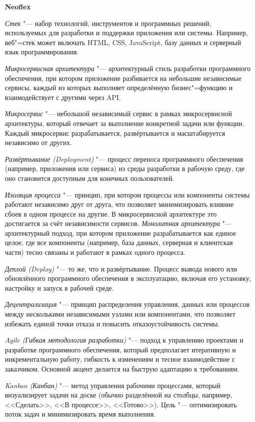 \documentclass{article}
\begin{document}
\begin{center}
    \textbf{Neoflex}
\end{center}

\textit{Стек} "--- набор технологий, инструментов и программных решений, используемых для разработки и поддержки приложения или системы. Например, веб"=стек может включать HTML, CSS, JavaScript, базу данных и серверный язык программирования.

\textit{Микросервисная архитектура} "--- архитектурный стиль разработки программного обеспечения, при котором приложение разбивается на небольшие независимые сервисы, каждый из которых выполняет определённую бизнес"=функцию и взаимодействует с другими через API.

\textit{Микросервис} "--- небольшой независимый сервис в рамках микросервисной архитектуры, который отвечает за выполнение конкретной задачи или функции. Каждый микросервис разрабатывается, развёртывается и масштабируется независимо от других.

\textit{Развёртывание (Deployment)} "--- процесс переноса программного обеспечения (например, приложения или сервиса) из среды разработки в рабочую среду, где оно становится доступным для конечных пользователей.

\textit{Изоляция процесса} "--- принцип, при котором процессы или компоненты системы работают независимо друг от друга, что позволяет минимизировать влияние сбоев в одном процессе на другие. В микросервисной архитектуре это достигается за счёт независимости сервисов.
\textit{Монолитная архитектура} "--- архитектурный подход, при котором приложение разрабатывается как единое целое, где все компоненты (например, база данных, серверная и клиентская части) тесно связаны и работают в рамках одного процесса.

\textit{Деплой (Deploy)} "--- то же, что и развёртывание. Процесс вывода нового или обновлённого программного обеспечения в эксплуатацию, включая его установку, настройку и запуск в рабочей среде.

\textit{Децентрализация} "--- принцип распределения управления, данных или процессов между несколькими независимыми узлами или компонентами, что позволяет избежать единой точки отказа и повысить отказоустойчивость системы.

\textit{Agile (Гибкая методология разработки)} "--- подход к управлению проектами и разработке программного обеспечения, который предполагает итеративную и инкрементальную работу, гибкость к изменениям и тесное взаимодействие с заказчиком. Основной акцент делается на быструю адаптацию к требованиям.

\textit{Kanban (Канбан)} "--- метод управления рабочими процессами, который визуализирует задачи на доске (обычно разделённой на столбцы, например, <<Сделать>>, <<В процессе>>, <<Готово>>). Цель "--- оптимизировать поток задач и минимизировать время выполнения.
\end{document}
